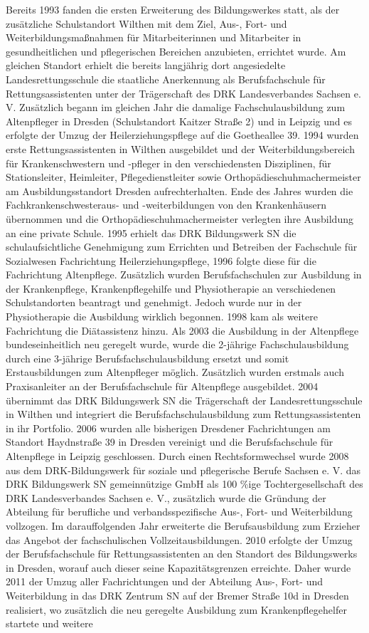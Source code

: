 Bereits 1993 fanden die ersten Erweiterung des Bildungswerkes statt, als der zusätzliche Schulstandort Wilthen mit dem Ziel, Aus-, Fort- und Weiterbildungsmaßnahmen für Mitarbeiterinnen und Mitarbeiter in gesundheitlichen und pflegerischen Bereichen anzubieten, errichtet wurde. Am gleichen Standort erhielt die bereits langjährig dort angesiedelte Landesrettungsschule die staatliche Anerkennung als Berufsfachschule für Rettungsassistenten unter der Trägerschaft des DRK Landesverbandes Sachsen e. V. Zusätzlich begann im gleichen Jahr die damalige Fachschulausbildung zum Altenpfleger in Dresden (Schulstandort Kaitzer Straße 2) und in Leipzig und es erfolgte der Umzug der Heilerziehungspflege auf die Goetheallee 39. 1994 wurden erste Rettungsassistenten in Wilthen ausgebildet und der Weiterbildungsbereich für Krankenschwestern und -pfleger in den verschiedensten Disziplinen, für Stationsleiter, Heimleiter, Pflegedienstleiter sowie Orthopädieschuhmachermeister am Ausbildungsstandort Dresden aufrechterhalten. Ende des Jahres wurden die Fachkrankenschwesteraus- und -weiterbildungen von den Krankenhäusern übernommen und die Orthopädieschuhmachermeister verlegten ihre Ausbildung an eine private Schule. 1995 erhielt das DRK Bildungswerk SN die schulaufsichtliche Genehmigung zum Errichten und Betreiben der Fachschule für Sozialwesen Fachrichtung Heilerziehungspflege, 1996 folgte diese für die Fachrichtung Altenpflege. Zusätzlich wurden Berufsfachschulen zur Ausbildung in der Krankenpflege, Krankenpflegehilfe und Physiotherapie an verschiedenen Schulstandorten beantragt und genehmigt. Jedoch wurde nur in der Physiotherapie die Ausbildung wirklich begonnen. 1998 kam als weitere Fachrichtung die Diätassistenz hinzu. Als 2003 die Ausbildung in der Altenpflege bundeseinheitlich neu geregelt wurde, wurde die 2-jährige Fachschulausbildung durch eine 3-jährige Berufsfachschulausbildung ersetzt und somit Erstausbildungen zum Altenpfleger möglich. Zusätzlich wurden erstmals auch Praxisanleiter an der Berufsfachschule für Altenpflege ausgebildet. 2004 übernimmt das DRK Bildungswerk SN die Trägerschaft der Landesrettungsschule in Wilthen und integriert die Berufsfachschulausbildung zum Rettungsassistenten in ihr Portfolio. 2006 wurden alle bisherigen Dresdener Fachrichtungen am Standort Haydnstraße 39 in Dresden vereinigt und die Berufsfachschule für Altenpflege in Leipzig geschlossen. Durch einen Rechtsformwechsel wurde 2008 aus dem DRK-Bildungswerk für soziale und pflegerische Berufe Sachsen e. V. das DRK Bildungswerk SN gemeinnützige GmbH als 100 \%ige Tochtergesellschaft des DRK Landesverbandes Sachsen e. V., zusätzlich wurde die Gründung der Abteilung für berufliche und verbands\-spe\-zi\-fische Aus-,\- Fort-\- und Weiterbildung vollzogen. Im darauffolgenden Jahr erweiterte die Berufsausbildung zum Erzieher das Angebot der fachschulischen Vollzeitausbildungen. 2010 erfolgte der Umzug der Berufsfachschule für Rettungsassistenten an den Standort des Bildungswerks in Dresden, worauf auch dieser seine Kapazitätsgrenzen erreichte. Daher wurde 2011 der Umzug aller Fachrichtungen und der Abteilung Aus-,\- Fort-\- und Weiterbildung in das DRK Zentrum SN auf der Bremer Straße 10d in Dresden realisiert, wo zusätzlich die neu geregelte Ausbildung zum Krankenpflegehelfer startete und weitere 